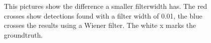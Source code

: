 \begin{figure}
\hfill
{}
	\caption{This pictures show the difference a smaller filterwidth has. The red crosses show detections found with a filter width of 0.01, the blue crosses the results using a Wiener filter. The white x marks the groundtruth.}
	\label{betterthansimplestorm}	
\end{figure}

